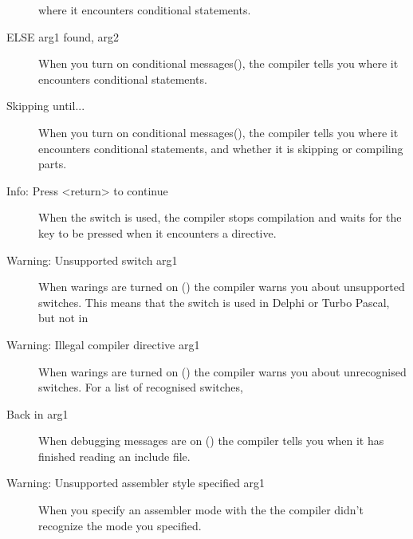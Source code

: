 \begin{description}
 where it encounters conditional statements.
\item [ELSE arg1 found, arg2]
 When you turn on conditional messages(), the compiler tells you 
 where it encounters conditional statements.
\item [Skipping until...]
 When you turn on conditional messages(), the compiler tells you 
 where it encounters conditional statements, and whether it is skipping or
 compiling parts.
\item [Info: Press <return> to continue]
 When the  switch is used, the compiler stops compilation
 and waits for the  key to be pressed when it encounters
 a  directive.
\item [Warning: Unsupported switch arg1]
 When warings are turned on () the compiler warns you about
 unsupported switches. This means that the switch is used in Delphi or
 Turbo Pascal, but not in \fpc
\item [Warning: Illegal compiler directive arg1]
 When warings are turned on () the compiler warns you about
 unrecognised switches. For a list of recognised switches, \progref
\item [Back in arg1]
 When debugging messages are on () the compiler tells you when
 it has finished reading an include file.
\item [Warning: Unsupported assembler style specified arg1]
 When you specify an assembler mode with the 
 the compiler didn't recognize the mode you specified. 
 \end{description}
